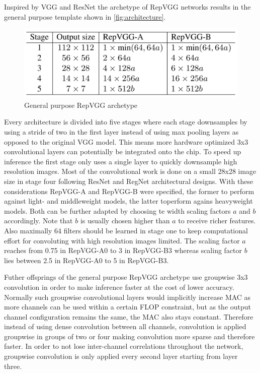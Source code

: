 Inspired by VGG and ResNet the archetype of RepVGG networks results in the general purpose template shown in \autoref{fig:architecture}.

\begin{figure}[t]
	\begin{center}
		\includegraphics[width=0.8\linewidth]{images/architecture.PNG}
	\end{center}
	\caption{General purpose RepVGG archetype}
	\label{fig:architecture}
\end{figure}

Every architecture is divided into five stages where each stage downsamples by using a stride of two in the first layer instead of using max pooling layers as opposed to the original VGG model. This means more hardware optimized 3x3 convolutional layers can potentially be integrated onto the chip. To speed up inference the first stage only uses a single layer to quickly downsample high resolution images. Most of the convolutional work is done on a small 28x28 image size in stage four following ResNet and RegNet architectural designs. With these considerations RepVGG-A and RepVGG-B were specified, the former to perform against light- and middleweight models, the latter toperform agains heavyweight models. Both can be further adapted by choosing te width scaling factors $a$ and $b$ accordingly. Note that $b$ is usually chosen higher than $a$ to receive richer features. Also maximally 64 filters should be learned in stage one to keep computational effort for convoluting with high resolution images limited. The scaling factor $a$ reaches from 0.75 in RepVGG-A0 to 3 in RepVGG-B3 whereas scaling factor $b$ lies between 2.5 in RepVGG-A0 to 5 in RepVGG-B3.  

Futher offsprings of the general purpose RepVGG archetype use groupwise 3x3 convolution in order to make inference faster at the cost of lower accuracy. Normally such groupwise convolutional layers would implicitly increase MAC as more channels can be used within a certain FLOP constraint, but as the output channel configuration remains the same, the MAC also stays constant. Therefore instead of using dense convolution between all channels, convolution is applied groupwise in groups of two or four making convolution more sparse and therefore faster. In order to not lose inter-channel correlations throughout the network, groupwise convolution is only applied every second layer starting from layer three.  
